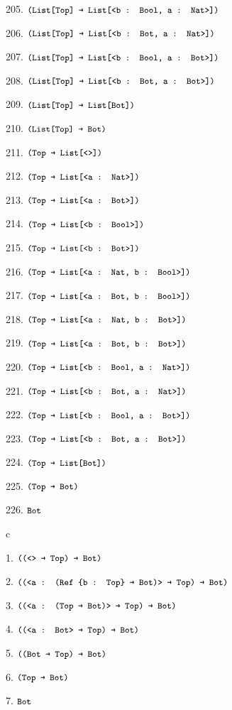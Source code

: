 \documentclass[dvipsnames]{article}
\let\codeOrig\code
\renewcommand{\code}[2][]{%
  \ifmmode
    \if\relax\detokenize{#1}\relax
      \mathchoice{\mbox{\normalfont\small\ttfamily #2}}{\mbox{\normalfont\small\ttfamily #2}}{\mbox{\normalfont\small\ttfamily #2}}{\mbox{\normalfont\small\ttfamily #2}}%
    \else
      \mathchoice{\mbox{\normalfont\small\ttfamily #2}}{\mbox{\normalfont\small\ttfamily #2}}{\mbox{\normalfont\small\ttfamily #2}}{\mbox{\normalfont\small\ttfamily #2}}%
    \fi
  \else
    \codeOrig[#1]{#2}%
  \fi}
\begin{document}
\begin{enumerate}
      205. $\code{(List[Top] → List[<b : Bool, a : Nat>])}$

      206. $\code{(List[Top] → List[<b : Bot, a : Nat>])}$

      207. $\code{(List[Top] → List[<b : Bool, a : Bot>])}$

      208. $\code{(List[Top] → List[<b : Bot, a : Bot>])}$

      209. $\code{(List[Top] → List[Bot])}$

      210. $\code{(List[Top] → Bot)}$

      211. $\code{(Top → List[<>])}$

      212. $\code{(Top → List[<a : Nat>])}$

      213. $\code{(Top → List[<a : Bot>])}$

      214. $\code{(Top → List[<b : Bool>])}$

      215. $\code{(Top → List[<b : Bot>])}$

      216. $\code{(Top → List[<a : Nat, b : Bool>])}$

      217. $\code{(Top → List[<a : Bot, b : Bool>])}$

      218. $\code{(Top → List[<a : Nat, b : Bot>])}$

      219. $\code{(Top → List[<a : Bot, b : Bot>])}$

      220. $\code{(Top → List[<b : Bool, a : Nat>])}$

      221. $\code{(Top → List[<b : Bot, a : Nat>])}$

      222. $\code{(Top → List[<b : Bool, a : Bot>])}$

      223. $\code{(Top → List[<b : Bot, a : Bot>])}$

      224. $\code{(Top → List[Bot])}$

      225. $\code{(Top → Bot)}$

      226. $\code{Bot}$

      c


      1. $\code{((<> → Top) → Bot)}$

      2. $\code{((<a : (Ref \{b : Top\} → Bot)> → Top) → Bot)}$

      3. $\code{((<a : (Top → Bot)> → Top) → Bot)}$

      4. $\code{((<a : Bot> → Top) → Bot)}$

      5. $\code{((Bot → Top) → Bot)}$

      6. $\code{(Top → Bot)}$

      7. $\code{Bot}$





\end{enumerate}
\end{document}
